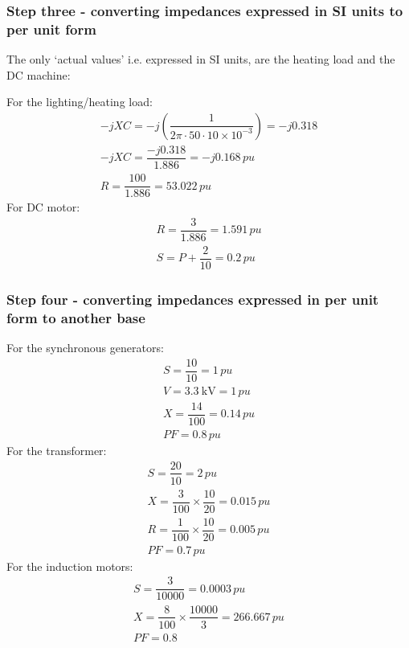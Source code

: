 \documentclass[class=report, crop=false, 12pt,a4paper]{standalone}
\begin{document}
\subsubsection{Step three - converting impedances expressed in SI units to per unit form}
The only `actual values' i.e. expressed in SI units, are the heating load and the DC machine:

For the lighting/heating load:
\begin{gather}
	-jXC = -j \left( \dfrac{1}{2\pi\cdot 50 \cdot 10 \times 10^{-3}}\right) = -j0.318\\
	-jXC = \dfrac{-j0.318}{1.886} = -j0.168\, \si{pu}\\
	R = \dfrac{100}{1.886} = 53.022\,\si{pu}
\end{gather}
For DC motor:
\begin{gather}
	R = \dfrac{3}{1.886} = 1.591\, \si{pu}\\
	S = P + \dfrac{2}{10} = 0.2\, \si{pu}
\end{gather}
\subsubsection{Step four - converting impedances expressed in per unit form to another base}
For the synchronous generators:
\begin{gather}
	S = \dfrac{10}{10} = 1\, \si{pu}\\
	V = \SI{3.3}{\kilo\volt} = 1\, \si{pu}\\
	X = \dfrac{14}{100} = 0.14\, \si{pu}\\
	PF = 0.8\, \si{pu}
\end{gather}
For the transformer:
\begin{gather}
	S = \dfrac{20}{10} = 2\, \si{pu}\\
	X = \dfrac{3}{100} \times \dfrac{10}{20} = 0.015\,\si{pu}\\
	R = \dfrac{1}{100} \times \dfrac{10}{20} = 0.005\,\si{pu}\\
	PF = 0.7\,\si{pu} 
\end{gather}
For the induction motors:
\begin{gather}
	S = \dfrac{3}{10000} = 0.0003\,\si{pu} \\
	X = \dfrac{8}{100} \times \dfrac{10000}{3} = 266.667\,\si{pu} \\
	PF = 0.8
\end{gather}
\end{document}
